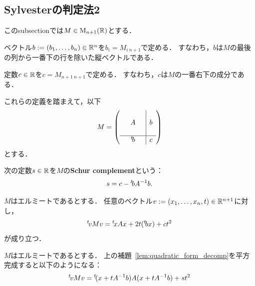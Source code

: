 
\subsection{Sylvesterの判定法2}

このsubsectionでは$M \in \operatorname{M}_{n+1}(\mathbb{R})$とする．

\begin{definition}
  \label{def:lastCol}
  \leanok
  ベクトル$b := (b_1, \ldots, b_n) \in \mathbb{R}^n$を$b_i = M_{i\ n+1}$で定める．
  すなわち，$b$は$M$の最後の列から一番下の行を除いた縦ベクトルである．
\end{definition}

\begin{definition}
  \label{def:lastEntry}
  \leanok
  定数$c \in \mathbb{R}$を$c = M_{n+1\ n+1}$で定める．
  すなわち，$c$は$M$の一番右下の成分である．
\end{definition}

これらの定義を踏まえて，以下
\begin{equation}
  M = \left(
    \begin{array}{ccc|c}
      &   & & \\
      & A & & b \\
      &   & & \\ \hline
      & {}^t\!b & & c
    \end{array}
  \right)
\end{equation}
とする．

\begin{definition}
  \label{def:schurComplement}
  \leanok
  次の定数$s \in \mathbb{R}$を$M$の\textbf{Schur complement}という：
  \begin{equation}
    s = c - {}^t\!b A^{-1} b.
  \end{equation}
\end{definition}

\begin{lemma}
  \label{lem:quadratic_form_decomp}
  \leanok
  $M$はエルミートであるとする．
  任意のベクトル$v := (x_1, \ldots, x_n, t) \in \mathbb{R}^{n+1}$に対し，
  \begin{equation}
    {}^t\!v M v
    = {}^t\!x A x + 2t({}^t\!bx) + ct^2
  \end{equation}
  が成り立つ．
\end{lemma}

\begin{lemma}
  \label{lem:quadratic_form_complete_square}
  \leanok
  $M$はエルミートであるとする．
  上の補題~\ref{lem:quadratic_form_decomp}を平方完成すると以下のようになる：
  \begin{equation}
    {}^t\!v M v
    = {}^t\!(x + t A^{-1} b) A (x + t A^{-1} b) + st^2
  \end{equation}
\end{lemma}

